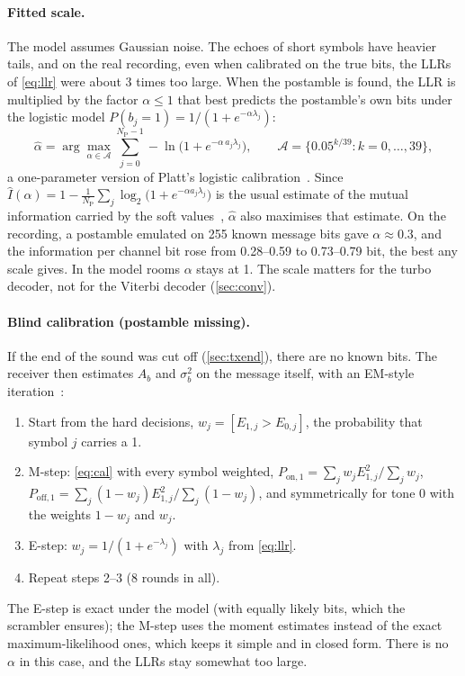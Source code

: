 \documentclass[11pt,a4paper]{article}
\newcommand{\NP}{N_{\mathrm{P}}}
\theoremstyle{remark}
\begin{document}
\paragraph{Fitted scale.}
\label{sec:alpha}
The model assumes Gaussian noise. The echoes of short symbols have heavier tails, and on the real recording, even when calibrated on the true bits, the LLRs of \cref{eq:llr} were about 3 times too large. When the postamble is found, the LLR is multiplied by the factor $\alpha \le 1$ that best predicts the postamble's own bits under the logistic model $P(b_j = 1) = 1/(1 + e^{-\alpha\lambda_j})$:
\begin{equation}
\hat\alpha = \arg\max_{\alpha \in \mathcal A} \sum_{j=0}^{\NP - 1} -\ln\bigl(1 + e^{-\alpha\, a_j \lambda_j}\bigr), \qquad \mathcal A = \bigl\{0.05^{k/39} : k = 0, \dots, 39\bigr\},
\label{eq:alpha}
\end{equation}
a one-parameter version of Platt's logistic calibration~\cite{platt}. Since $\hat I(\alpha) = 1 - \frac{1}{\NP}\sum_j \log_2\bigl(1 + e^{-\alpha a_j \lambda_j}\bigr)$ is the usual estimate of the mutual information carried by the soft values~\cite{hagenauerexit}, $\hat\alpha$ also maximises that estimate. On the recording, a postamble emulated on 255 known message bits gave $\alpha \approx 0.3$, and the information per channel bit rose from 0.28--0.59 to 0.73--0.79 bit, the best any scale gives. In the model rooms $\alpha$ stays at 1. The scale matters for the turbo decoder, not for the Viterbi decoder (\cref{sec:conv}).

\paragraph{Blind calibration (postamble missing).}
\label{sec:em}
If the end of the sound was cut off (\cref{sec:txend}), there are no known bits. The receiver then estimates $A_b$ and $\sigma_b^2$ on the message itself, with an EM-style iteration~\cite{dempster}:
\begin{enumerate}
\item Start from the hard decisions, $w_j = [E_{1,j} > E_{0,j}]$, the probability that symbol $j$ carries a 1.
\item M-step: \cref{eq:cal} with every symbol weighted, $P_{\text{on},1} = \sum_j w_j E_{1,j}^2 / \sum_j w_j$, $P_{\text{off},1} = \sum_j (1-w_j) E_{1,j}^2 / \sum_j (1-w_j)$, and symmetrically for tone 0 with the weights $1 - w_j$ and $w_j$.
\item E-step: $w_j = 1/(1 + e^{-\lambda_j})$ with $\lambda_j$ from \cref{eq:llr}.
\item Repeat steps 2--3 (8 rounds in all).
\end{enumerate}
The E-step is exact under the model (with equally likely bits, which the scrambler ensures); the M-step uses the moment estimates instead of the exact maximum-likelihood ones, which keeps it simple and in closed form. There is no $\alpha$ in this case, and the LLRs stay somewhat too large.
\end{document}
